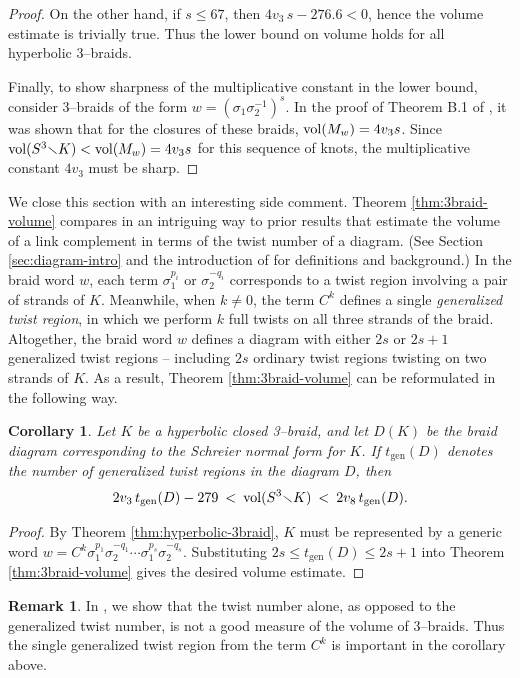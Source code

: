 \documentclass[11pt]{amsart}
\renewcommand{\setminus}{{\smallsetminus}}
\newcommand{\vol}{{\rm vol}}
\newcommand{\tgen}{{t_{\mathrm{gen}}(D)}}
\theoremstyle{plain}
\newtheorem{corollary}[theorem]{Corollary}
\theoremstyle{definition}
\newtheorem*{remark}{Remark}
\begin{document}
\begin{proof}
On the other hand, if $s \leq 67$, then $4v_3 \, s - 276.6 < 0$, hence
the volume estimate is trivially true.  Thus the lower bound on volume
holds for all hyperbolic $3$--braids.

Finally, to show sharpness of the multiplicative constant in the lower
bound, consider $3$--braids of the form $w=(\sigma_1
\sigma_2^{-1})^s$.  In the proof of Theorem B.1 of
\cite{gf:two-bridge}, it was shown that for the closures of these
braids, $\vol(M_w) = 4v_3s$.  Since $\vol(S^3\setminus K) < \vol(M_w)
= 4v_3s$ for this sequence of knots, the multiplicative constant
$4v_3$ must be sharp.
\end{proof}

We close this section with an interesting side comment.  Theorem
\ref{thm:3braid-volume} compares in an intriguing way to prior
results that estimate the volume of a link complement in terms of the
twist number of a diagram. (See Section \ref{sec:diagram-intro} and
the introduction of \cite{fkp:coils} for definitions and background.)
In the braid word $w$, each term $\sigma_1^{p_i}$ or $\sigma_2^{-q_i}$
corresponds to a twist region involving a pair of strands of $K$.
Meanwhile, when $k \neq 0$, the term $C^k$ defines a single \emph{generalized twist
region}, in which we perform $k$ full twists on all three strands of
the braid.
Altogether, the braid word $w$ defines a diagram with either $2s$ or $2s+1$
generalized twist regions -- including $2s$ ordinary twist regions
twisting on two strands of $K$. As a result, Theorem
\ref{thm:3braid-volume} can be reformulated in the following way.

\begin{corollary}\label{cor:3braid-twists}
Let $K$ be a hyperbolic closed 3--braid, and let $D(K)$ be the braid 
diagram corresponding to the Schreier normal form for $K$. If
$\tgen$ denotes the number of generalized twist regions in the diagram
$D$, then
$$2v_3 \, \tgen - 279 \: < \: \vol(S^3 \setminus K) \: < \: 2v_8 \,
\tgen.$$
\end{corollary}

\begin{proof}
By Theorem \ref{thm:hyperbolic-3braid}, $K$ must be represented by a
generic word $w = C^k \sigma_1^{p_1} \sigma_2^{-q_1} \cdots
\sigma_1^{p_s} \sigma_2^{-q_s}$. Substituting $2s \leq \tgen \leq 2s+1$ into
Theorem \ref{thm:3braid-volume} gives the desired volume estimate.
\end{proof}

\begin{remark}
In \cite[Corollary 3.2]{fkp:coils}, we show that the twist number alone, as opposed
to the generalized twist number, is not a good measure of the volume
of 3--braids.  Thus the single generalized twist region from the term
$C^k$ is important in the corollary above.
\end{remark}
\end{document}
